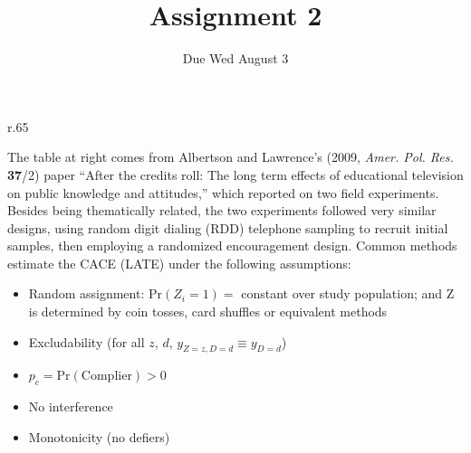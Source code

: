 \documentclass{article}
\title{Assignment 2}
\author{Due Wed August 3}
\begin{document}
\maketitle

\begin{minipage}{1.0\linewidth}

\begin{wrapfigure}{r}{.65\linewidth}
\end{wrapfigure}

The table at right comes from Albertson and Lawrence's (2009, \textit{Amer. Pol. Res.} \textbf{37}/2) paper ``After the credits roll: The long term effects of educational television on public knowledge and attitudes,'' which reported on two field experiments. Besides being thematically related, the two experiments followed very similar designs, using random digit dialing (RDD) telephone sampling to recruit initial samples, then employing a randomized encouragement design.  Common methods estimate the CACE (LATE) under the following assumptions:

\begin{itemize}
\item Random assignment: $\mathrm{Pr}(Z_{i}=1) = $ constant over study population;  and $\mathrm{Z} $ is determined by coin tosses, card shuffles or equivalent methods
\item Excludability (for all $z$, $d$, $y_{Z=z, D=d} \equiv y_{D=d}$)
\item $p_{c} = \mathrm{Pr}(\mathrm{Complier}) > 0$
\item No interference
\item Monotonicity (no defiers)
\end{itemize}

\end{minipage}
\vspace{4ex}
\end{document}
